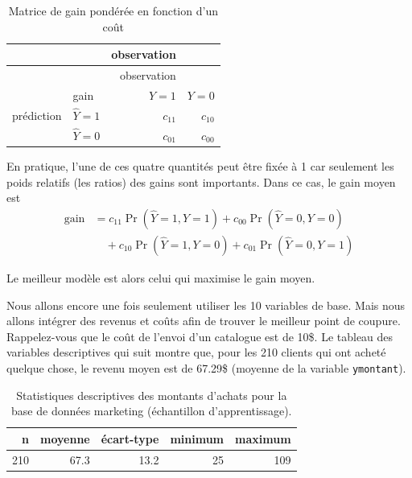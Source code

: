 \documentclass[
  11pt,
  letterpaper,
]{scrbook}
\theoremstyle{definition}
\theoremstyle{remark}
\begin{document}
\hypertarget{tbl-03-gain2}{}
\begin{longtable}[]{@{}llrr@{}}
\caption{\label{tbl-03-gain2}Matrice de gain pondérée en fonction d'un
coût}\tabularnewline
\toprule\noalign{}
& & observation & \\
\midrule\noalign{}
\endfirsthead
\toprule\noalign{}
& & observation & \\
\midrule\noalign{}
\endhead
\bottomrule\noalign{}
\endlastfoot
& gain & \(Y=1\) & \(Y=0\) \\
prédiction & \(\widehat{Y}=1\) & \(c_{11}\) & \(c_{10}\) \\
& \(\widehat{Y}=0\) & \(c_{01}\) & \(c_{00}\) \\
\end{longtable}

En pratique, l'une de ces quatre quantités peut être fixée à 1 car
seulement les poids relatifs (les ratios) des gains sont importants.
Dans ce cas, le gain moyen est \begin{align*}
\text{gain} &= c_{11} \Pr(\widehat{Y}=1, Y=1) + c_{00}\Pr(\widehat{Y}=0, Y=0) 
\\ &\quad + c_{10} \Pr(\widehat{Y}=1, Y=0)  + c_{01} \Pr(\widehat{Y}=0, Y=1)
\end{align*}

Le meilleur modèle est alors celui qui maximise le gain moyen.

Nous allons encore une fois seulement utiliser les 10 variables de base.
Mais nous allons intégrer des revenus et coûts afin de trouver le
meilleur point de coupure. Rappelez-vous que le coût de l'envoi d'un
catalogue est de 10\$. Le tableau des variables descriptives qui suit
montre que, pour les 210 clients qui ont acheté quelque chose, le revenu
moyen est de 67.29\$ (moyenne de la variable \texttt{ymontant}).

\hypertarget{tbl-dbm-ymontant-apprentissage}{}
\begin{table}
\caption{\label{tbl-dbm-ymontant-apprentissage}Statistiques descriptives des montants d'achats pour la base de données
marketing (échantillon d'apprentissage). }\tabularnewline

\centering
\begin{tabular}{rrrrr}
\toprule
n & moyenne & écart-type & minimum & maximum\\
\midrule
210 & 67.3 & 13.2 & 25 & 109\\
\bottomrule
\end{tabular}
\end{table}
\end{document}
